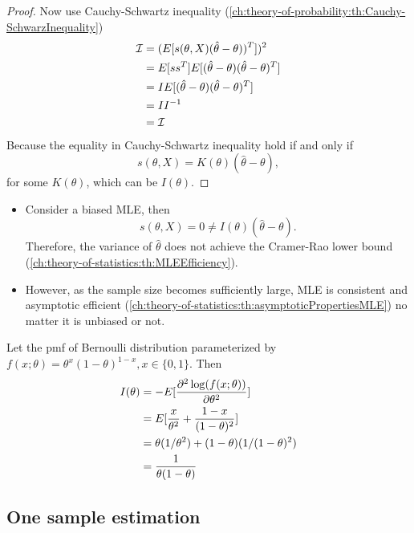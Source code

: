 \begin{refsection}
\begin{proof}
Now use Cauchy-Schwartz inequality (\autoref{ch:theory-of-probability:th:Cauchy-SchwarzInequality})
\begin{align*}
\mathcal{I} &= (E[s(\theta,X)(\hat{\theta} - \theta))^T])^2 \\
    &= E[ss^T]E[(\hat{\theta} - \theta)(\hat{\theta} - \theta)^T] \\
    &= IE[(\hat{\theta} - \theta)(\hat{\theta} - \theta)^T] \\
    &= II^{-1} \\
    &= \mathcal{I}
\end{align*}
Because the equality in Cauchy-Schwartz inequality hold if and only if
$$s(\theta, X) = K(\theta) (\hat{\theta} - \theta),$$
for some $K(\theta)$, which can be $I(\theta)$.	
\end{proof}

\begin{remark}\hfill
\begin{itemize}
	\item Consider a biased MLE, then
	$$s(\theta,X) = 0 \neq I(\theta) (\hat{\theta} - \theta).$$
	Therefore, the variance of $\hat{\theta}$ does not achieve the Cramer-Rao lower bound (\autoref{ch:theory-of-statistics:th:MLEEfficiency}).	
	\item However, as the sample size becomes sufficiently large, MLE is consistent and asymptotic efficient (\autoref{ch:theory-of-statistics:th:asymptoticPropertiesMLE}) no matter it is unbiased or not.  
\end{itemize}	

\end{remark}



\begin{example}
	Let the pmf of Bernoulli distribution parameterized by $f(x;\theta) = \theta^x(1-\theta)^{1-x},x\in\{0,1\}$. Then
	\begin{align*}
	I(\theta) &= -E[\frac{\partial^2 \log(f(x;\theta))}{\partial \theta^2}] \\
	&= E[\frac{x}{\theta^2} + \frac{1-x}{(1-\theta)^2}]\\
	&= \theta (1/\theta^2) + (1-\theta)(1/(1-\theta)^2) \\
	&= \frac{1}{\theta(1-\theta)}
	\end{align*}
\end{example}



\subsection{One sample estimation}



\end{refsection}
